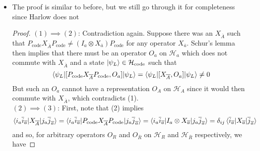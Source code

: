 \documentclass[12pt,a4paper]{article}
\numberwithin{equation}{section}
\newcommand{\Pc}{P_{\text{code}}}
\newcommand{\Hcode}{\mathcal{H}_{\text{code}}}
\newcommand{\ol}[1]{\overline{#1}}
\theoremstyle{definition}
\theoremstyle{theorem}
\newtheorem{theorem}{Theorem}[section]
\theoremstyle{example}
\begin{document}
\begin{itemize}
\begin{theorem}[Subsystem Error Correction]
\begin{enumerate}
				\begin{equation}
					\rho_{R\ol{R}\ol{A}}[\phi]=\rho_{R}[\phi]\otimes\rho_{\ol{R}\ol{A}}[\phi]
				\end{equation}
				\item $|a|\leq |A|$, and if we decompose $\mathcal{H}_{A}=(\mathcal{H}_{A_{1}}\otimes\mathcal{H}_{A_{2}})\oplus\mathcal{H}_{A_{3}}$ with $|A_{1}|=|a|$ and $|A_{3}|<|a|$, there exists a unitary transformation $U_{A}$ on $\mathcal{H}_{A}$ and a set of orthonormal states $\ket{\chi_{j}}_{A_{2}\ol{A}}\in\mathcal{H}_{A_{2}\ol{A}}$ such that
				\begin{equation}
					\ket{i_{a}\ol{j}_{\ol{a}}}=U_{A}(\ket{i}_{A_{1}}\otimes\ket{\chi_{j}}_{A_{2}\ol{A}})
				\end{equation}
				where $\ket{i}_{A_{1}}$ is an orthonormal basis for $\mathcal{H}_{A_{1}}$.
			\end{enumerate}
		\end{theorem}
		\item The proof is similar to before, but we still go through it for completeness since Harlow does not
		\begin{proof}
			$(1)\implies(2)$: Contradiction again. Suppose there was an $X_{\ol{A}}$ such that $\Pc X_{\ol{A}}\Pc\neq(I_{a}\otimes X_{\ol{a}})\Pc$ for any operator $X_{\ol{a}}$. Schur's lemma then implies that there must be an operator $O_{a}$ on $\mathcal{H}_{a}$ which does not commute with $X_{\ol{A}}$ and a state $\ket{\psi_{L}}\in\Hcode$ such that 
			\begin{equation}
				\braket{\psi_{L}|[\Pc X_{\ol{A}}\Pc,O_{a}]|\psi_{L}}=\braket{\psi_{L}|[X_{\ol{A}},O_{a}]|\psi_{L}}\neq 0
			\end{equation}
			But such an $O_{a}$ cannot have a representation $O_{A}$ on $\mathcal{H}_{A}$ since it would then commute with $X_{\ol{A}}$, which contradicts (1).\\
			$(2)\implies(3)$: First, note that (2) implies
			\begin{equation}
				\braket{i_{a}\overline{i}_{\overline{a}}|X_{\overline{A}}|j_{a}\overline{j}_{\overline{a}}}=\braket{i_{a}\overline{i}_{\overline{a}}|\Pc X_{\overline{A}}\Pc|j_{a}\overline{j}_{\overline{a}}}=\braket{i_{a}\overline{i}_{\overline{a}}|I_{a}\otimes X_{\overline{a}}|j_{a}\overline{j}_{\overline{a}}}=\delta_{ij}\braket{\overline{i}_{\overline{a}}|X_{\overline{a}}|\overline{j}_{\overline{a}}}
			\end{equation}
			and so, for arbitrary operators $O_{R}$ and $O_{\overline{R}}$ on $\mathcal{H}_{R}$ and $\mathcal{H}_{\overline{R}}$ respectively, we have

\end{proof}
\end{itemize}
\end{document}
